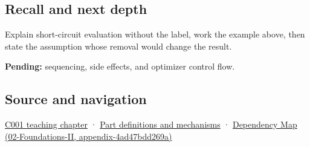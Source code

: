 \subsection{Recall and next depth}\label{appendix-2e245a6fa8d3-recall-and-next-depth}

Explain short-circuit evaluation without the label, work the example above, then state the assumption whose removal would change the result.

\textbf{Pending:} sequencing, side effects, and optimizer control flow.

\subsection{Source and navigation}\label{appendix-2e245a6fa8d3-source-and-navigation}

\hyperref[01-foundations-i-ch001-from-a-signal-to-an-interpretation]{C001 teaching chapter} · \hyperref[appendix-fd090d982a15]{Part definitions and mechanisms} · \href{../02-Foundations-II/main.pdf\#nameddest=appendix-4ad47bdd269a}{Dependency Map (02-Foundations-II, appendix-4ad47bdd269a)}
